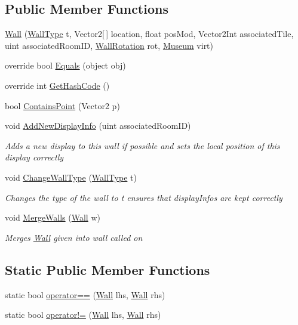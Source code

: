 \subsection*{Public Member Functions}
\begin{DoxyCompactItemize}
\item 
\mbox{\hyperlink{class_wall_a4c5f79551eaa6006ef8d243c6cb4407f}{Wall}} (\mbox{\hyperlink{class_wall_a1366d94ac70428624a6703d7db89638d}{Wall\+Type}} t, Vector2\mbox{[}$\,$\mbox{]} location, float pos\+Mod, Vector2\+Int associated\+Tile, uint associated\+Room\+ID, \mbox{\hyperlink{class_wall_a0ff16a0e73bfc8f0d89c5fd6849e3a97}{Wall\+Rotation}} rot, \mbox{\hyperlink{class_museum}{Museum}} virt)
\item 
override bool \mbox{\hyperlink{class_wall_a1f2892cd73109765a83ddeda382309eb}{Equals}} (object obj)
\item 
override int \mbox{\hyperlink{class_wall_a4c40b2b1afaf636c50cc2ff7597442e9}{Get\+Hash\+Code}} ()
\item 
bool \mbox{\hyperlink{class_wall_a268f71deeceb999a03235e62b43421c2}{Contains\+Point}} (Vector2 p)
\item 
void \mbox{\hyperlink{class_wall_aaed262c3f6b37525136f3278ca2e80cb}{Add\+New\+Display\+Info}} (uint associated\+Room\+ID)
\begin{DoxyCompactList}\small\item\em Adds a new display to this wall if possible and sets the local position of this display correctly \end{DoxyCompactList}\item 
void \mbox{\hyperlink{class_wall_afe665d38b06894cc2d3e1e091d977ecb}{Change\+Wall\+Type}} (\mbox{\hyperlink{class_wall_a1366d94ac70428624a6703d7db89638d}{Wall\+Type}} t)
\begin{DoxyCompactList}\small\item\em Changes the type of the wall to t ensures that display\+Infos are kept correctly \end{DoxyCompactList}\item 
void \mbox{\hyperlink{class_wall_a8104353e14b558c07aaef0a26f246418}{Merge\+Walls}} (\mbox{\hyperlink{class_wall}{Wall}} w)
\begin{DoxyCompactList}\small\item\em Merges \mbox{\hyperlink{class_wall}{Wall}} given into wall called on \end{DoxyCompactList}\end{DoxyCompactItemize}
\subsection*{Static Public Member Functions}
\begin{DoxyCompactItemize}
\item 
static bool \mbox{\hyperlink{class_wall_a0eaebc195033f236c71d8c812b6a0256}{operator==}} (\mbox{\hyperlink{class_wall}{Wall}} lhs, \mbox{\hyperlink{class_wall}{Wall}} rhs)
\item 
static bool \mbox{\hyperlink{class_wall_a12a6667a52ef86d8678ecb3cd21972e2}{operator!=}} (\mbox{\hyperlink{class_wall}{Wall}} lhs, \mbox{\hyperlink{class_wall}{Wall}} rhs)
\end{DoxyCompactItemize}
